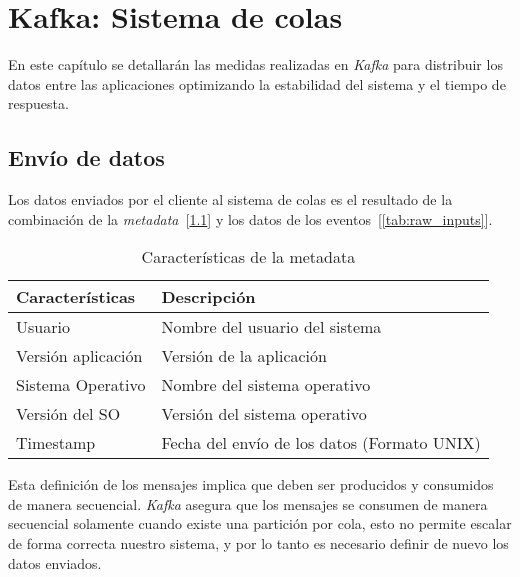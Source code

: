 \chapter{Kafka: Sistema de colas}
\label{sec:kafka}

En este capítulo se detallarán las medidas realizadas en \textit{Kafka} para distribuir los datos entre las aplicaciones optimizando la estabilidad del sistema y el tiempo de respuesta.

\section{Envío de datos}

Los datos enviados por el cliente al sistema de colas es el resultado de la combinación de la \textit{metadata}~[\cref{tab:metadata_feature}] y los datos de los eventos~[\cref{tab:raw_inputs}].


\begin{table}[htbp!]
    \centering
    \begin{tabular}{ l  l}
        \toprule
        \textbf{Características} & \textbf{Descripción}                        \\
        \midrule \midrule
        Usuario                  & Nombre del usuario del sistema              \\ \midrule
        Versión aplicación       & Versión de la aplicación                    \\ \midrule
        Sistema Operativo        & Nombre del sistema operativo                \\ \midrule
        Versión del SO           & Versión del sistema operativo               \\ \midrule
        Timestamp                & Fecha del envío de los datos (Formato UNIX) \\
        \bottomrule
    \end{tabular}
    \caption{\label{tab:metadata_feature}Características de la metadata}
\end{table}

Esta definición de los mensajes implica que deben ser producidos y consumidos de manera secuencial. \textit{Kafka} asegura que los mensajes se consumen de manera secuencial solamente cuando existe una partición por cola, esto no permite escalar de forma correcta nuestro sistema, y por lo tanto es necesario definir de nuevo los datos enviados.


